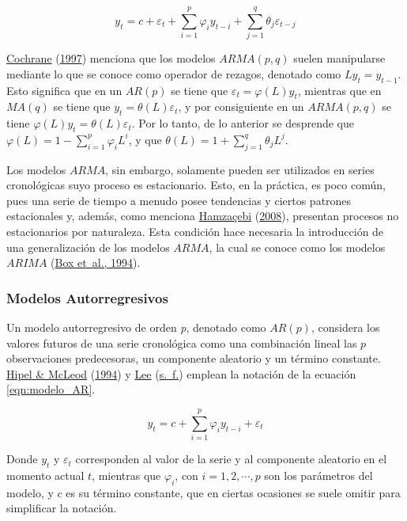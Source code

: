 \documentclass[
]{article}
\begin{document}
\begin{equation}
\label{eqn:modelo_ARMA}
y_t=c+\varepsilon_t+\sum_{i=1}^p \varphi_iy_{t-i}+\sum_{j=1}^q \theta_j \varepsilon_{t-j}
\end{equation}

\protect\hyperlink{ref-Cochrane}{Cochrane}
(\protect\hyperlink{ref-Cochrane}{1997}) menciona que los modelos
\(ARMA(p,q)\) suelen manipularse mediante lo que se conoce como operador
de rezagos, denotado como \(Ly_t=y_{t-1}\). Esto significa que en un
\(AR(p)\) se tiene que \(\varepsilon_t=\varphi(L)y_t\), mientras que en
\(MA(q)\) se tiene que \(y_t=\theta(L)\varepsilon_t\), y por
consiguiente en un \(ARMA(p,q)\) se tiene
\(\varphi(L)y_t=\theta(L)\varepsilon_t\). Por lo tanto, de lo anterior
se desprende que \(\varphi(L)=1-\sum_{i=1}^p \varphi_iL^i\), y que
\(\theta(L)=1+\sum_{j=1}^q\theta_jL^j\).

Los modelos \(ARMA\), sin embargo, solamente pueden ser utilizados en
series cronológicas suyo proceso es estacionario. Esto, en la práctica,
es poco común, pues una serie de tiempo a menudo posee tendencias y
ciertos patrones estacionales y, además, como menciona
\protect\hyperlink{ref-Hamzacebi}{Hamzaçebi}
(\protect\hyperlink{ref-Hamzacebi}{2008}), presentan procesos no
estacionarios por naturaleza. Esta condición hace necesaria la
introducción de una generalización de los modelos \(ARMA\), la cual se
conoce como los modelos \(ARIMA\)
(\protect\hyperlink{ref-box-jenkins}{Box et~al., 1994}).

\subsubsection{Modelos Autorregresivos}

Un modelo autorregresivo de orden \emph{p}, denotado como \(AR(p)\),
considera los valores futuros de una serie cronológica como una
combinación lineal las \(p\) observaciones predecesoras, un componente
aleatorio y un término constante. \protect\hyperlink{ref-Hipel}{Hipel \&
McLeod} (\protect\hyperlink{ref-Hipel}{1994}) y
\protect\hyperlink{ref-Lee}{Lee} (\protect\hyperlink{ref-Lee}{s.~f.})
emplean la notación de la ecuación \ref{eqn:modelo_AR}.

\begin{equation}
\label{eqn:modelo_AR}
y_t=c+\sum_{i=1}^p \varphi_iy_{t-i}+\varepsilon_t
\end{equation}

Donde \(y_t\) y \(\varepsilon_t\) corresponden al valor de la serie y al
componente aleatorio en el momento actual \(t\), mientras que
\(\varphi_i\), con \(i=1,2,\cdots,p\) son los parámetros del modelo, y
\(c\) es su término constante, que en ciertas ocasiones se suele omitir
para simplificar la notación.
\end{document}
